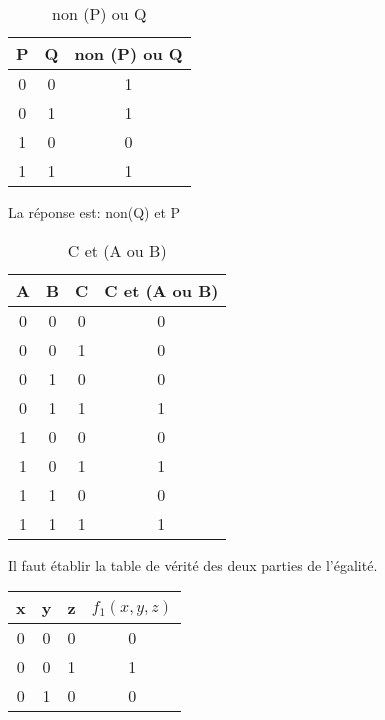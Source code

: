 \documentclass[a4paper,11pt]{article}
\begin{document}
\begin{Form}
\begin{exo}
\begin{table}[!h]
\begin{center}
\begin{tabular}{|c|c|c|}
\hline 
P & Q & non (P) ou Q \\ 
\hline 
0 & 0 & 1 \\ 
\hline 
0 & 1 & 1 \\ 
\hline 
1 & 0 & 0 \\
\hline 
1 & 1 & 1 \\
\hline 
\end{tabular}
\caption{\label{ex1}non (P) ou Q}
\end{center}
\end{table} 
\end{exo}
\begin{exo}
La réponse est: non(Q) et P
\end{exo}
\begin{exo}
\begin{table}[!h]
\begin{center}
\begin{tabular}{|*4{c|}}
\hline 
A & B & C & C et (A ou B) \\ 
\hline 
0 & 0 & 0 & 0 \\ 
\hline 
0 & 0 & 1 & 0 \\ 
\hline 
0 & 1 & 0 & 0 \\
\hline 
0 & 1 & 1 & 1 \\
\hline 
1 & 0 & 0 & 0 \\ 
\hline 
1 & 0 & 1 & 1 \\ 
\hline 
1 & 1 & 0 & 0 \\
\hline 
1 & 1 & 1 & 1 \\
\hline 
\end{tabular}
\caption{\label{ex3}C et (A ou B)}
\end{center}
\end{table} 
\end{exo}
\begin{exo}
Il faut établir la table de vérité des deux parties de l'égalité.
\begin{multicols}{2}
\begin{center}
\begin{tabular}{|*4{c|}}
\hline 
x & y & z & $f_1(x,y,z)$ \\ 
\hline 
0 & 0 & 0 & 0 \\ 
\hline 
0 & 0 & 1 & 1 \\ 
\hline 
0 & 1 & 0 & 0 \\

\end{tabular}
\end{center}
\end{multicols}
\end{exo}
\end{Form}
\end{document}
